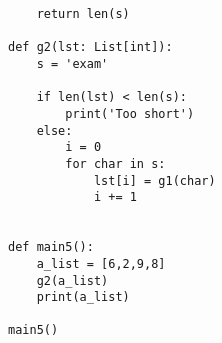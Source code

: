 \documentclass{article}
\begin{document}
\begin{enumerate}
\begin{verbatim}
    return len(s)

def g2(lst: List[int]):
    s = 'exam'

    if len(lst) < len(s):
        print('Too short')
    else:
        i = 0
        for char in s:
            lst[i] = g1(char)
            i += 1


def main5():
    a_list = [6,2,9,8]
    g2(a_list)
    print(a_list)

main5()
\end{verbatim}

\vfill
\vfill


\end{enumerate}
\end{document}
